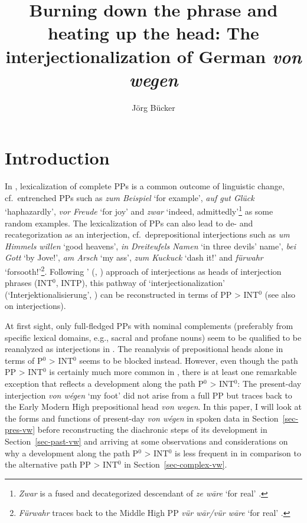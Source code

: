 \documentclass[output=paper
  ,nobabel
  ,draftmode
  ,babelshorthands
  ,colorlinks, citecolor=brown
]{langscibook}
\title[Burning down the phrase and heating up the head]{Burning down the phrase and heating up the head: The interjectionalization of German \emph{von wegen}}
\author{Jörg Bücker\orcid{0000-0003-4864-3374}\affiliation{Heinrich-Heine-Universität Düsseldorf}}
\begin{document}
\maketitle


\section{Introduction}\label{sec-intro-büc}

In , lexicalization of complete PPs is a common outcome of linguistic change, cf.\ entrenched PPs such as \emph{zum Beispiel} `for example', \emph{auf gut Glück} `haphazardly', \emph{vor Freude} `for joy'
and \emph{zwar} `indeed, admittedly'\footnote{\emph{Zwar} is a fused and decategorized descendant of \emph{ze wāre} `for real' \citep[cf.][1020]{Kluge2002}.}
as some random examples. The lexicalization of PPs can also lead to de- and recategorization as an interjection, cf.\
deprepositional interjections such as \emph{um Himmels willen} `good heavens', \emph{in Dreiteufels Namen} `in three devils' name', \emph{bei Gott} `by Jove!', \emph{am Arsch} `my ass', \emph{zum Kuckuck} `dash it!' and \emph{fürwahr} `forsooth!'\footnote{\textit{Fürwahr} traces back to the Middle High  PP \emph{vür wār/vür wāre} `for real' \citep[cf.][927]{GrimmGrimm1878}.}. 
Following \citeauthor{Fries1992}' (\citeyear{Fries1992}, \citeyear{Fries22}) approach of interjections as heads of interjection phrases (INT$^0$, INTP), this pathway of `interjectionalization' (`Interjektionalisierung', \citealp{Nuebling2001}) can be reconstructed in terms of PP > INT$^0$ (see also \citealp{Ehlich1986,Reisigl1999,Nuebling2004} on interjections).

At first sight, only full-fledged PPs with nominal complements (preferably from specific lexical domains, e.g., sacral and profane nouns) seem to be qualified to be reanalyzed as interjections in . The reanalysis of prepositional heads alone in terms of P$^0$ > INT$^0$ seems to be blocked instead. However, even though the path PP > INT$^0$ is certainly much more common in , there is at least one remarkable exception that reflects a development along the path P$^0$ > INT$^0$: The present-day  interjection \emph{von wégen} `my foot' did not arise from a full PP but traces back to the Early Modern High  prepositional head \emph{von wegen}. In this paper, I will look at the forms and functions of present-day  \emph{von wégen} in spoken data in Section~\ref{sec-pres-vw} before reconstructing the diachronic steps of its development in Section~\ref{sec-past-vw} and arriving at some observations and considerations on why a development along the path P$^0$ > INT$^0$ is less frequent in  in comparison to the alternative path PP > INT$^0$ in Section~\ref{sec-complex-vw}.
\end{document}
